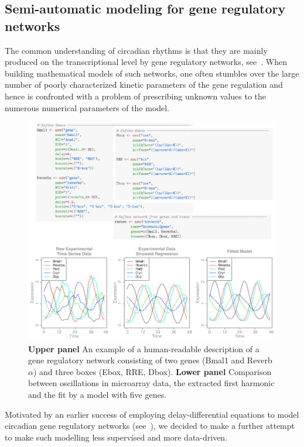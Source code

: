 \subsection{Semi-automatic modeling for gene regulatory networks}
The common understanding of circadian rhythms is that they are mainly
produced on the transcriptional level by gene regulatory networks,
see~\cite{reppert2002coordination}. When building mathematical models
of such networks, one often stumbles over the large number of poorly
characterized kinetic parameters of the gene regulation and hence is
confronted with a problem of prescribing unknown values to the
numerous numerical parameters of the model.

\begin{figure}
\begin{center}
\includegraphics[width=\linewidth]{figures/matt/matt.pdf}
\end{center}
\caption{
  {\bf Upper panel} An example of a human-readable description of a
  gene regulatory network consisting of two genes (Bmal1 and
  Reverb$\alpha$) and three boxes (Ebox, RRE, Dbox).
  {\bf Lower panel} Comparison between oscillations in microarray
  data, the extracted first harmonic and the fit by a model with five
  genes.
\label{fig::matt}
}
\end{figure}

Motivated by an earlier success of employing delay-differential
equations to model circadian gene regulatory networks
(see~\cite{korencic2012interplay}), we decided to make a further
attempt to make such modelling less supervised and more data-driven.

